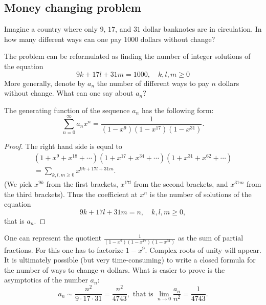 \begin{page}
\setcounter{section}{3}
\setcounter{subsection}{1}
\setcounter{dfn}{0}
\label{portion:879}

\subsection{Money changing problem}
Imagine a country where only $9$, $17$, and $31$ dollar banknotes are in circulation.
In how many different ways can one pay $1000$ dollars without change?

The problem can be reformulated as finding the number of integer solutions of the equation
\[
9k + 17l + 31m = 1000, \quad k, l, m \ge 0
\]
More generally, denote by $a_n$ the number of different ways to pay $n$ dollars without change.
What can one say about $a_n$?


\end{page}

\begin{page}
\setcounter{section}{3}
\setcounter{subsection}{1}
\setcounter{dfn}{1}
\label{portion:881}

\begin{thm}
\label{thm:Dollars}
The generating function of the sequence $a_n$ has the following form:
\[
\sum_{n=0}^\infty a_n x^n = \frac{1}{(1-x^9)(1-x^{17})(1-x^{31})}.
\]
\end{thm}

\end{page}

\begin{page}
\setcounter{section}{3}
\setcounter{subsection}{2}
\setcounter{dfn}{1}
\label{portion:882}

\begin{proof}
The right hand side is equal to
\begin{multline*}
(1 + x^9 + x^{18} + \cdots)(1 + x^{17} + x^{34} + \cdots)(1 + x^{31} + x^{62} + \cdots)\\
= \sum_{k,l,m\ge 0} x^{9k+17l+31m}.
\end{multline*}
(We pick $x^{9k}$ from the first brackets, $x^{17l}$ from the second brackets, and $x^{31m}$ from the third brackets).
Thus the coefficient at $x^n$ is the number of solutions of the equation
\[
9k + 17l + 31m = n, \quad k, l, m \ge 0,
\]
that is $a_n$.
\end{proof}

One can represent the quotient $\frac{1}{(1-x^9)(1-x^{17})(1-x^{31})}$ as the sum of partial fractions.
For this one has to factorize $1-x^9$.
Complex roots of unity will appear.
It is ultimately possible (but very time-consuming) to write a closed formula for the number of ways to change $n$ dollars.
What is easier to prove is the asymptotics of the number $a_n$:
\[
a_n \sim \frac{n^2}{9 \cdot 17 \cdot 31} = \frac{n^2}{4743}, \text{ that is } \lim_{n \to 0} \frac{a_n}{n^2} = \frac{1}{4743}.
\]





\end{page}

